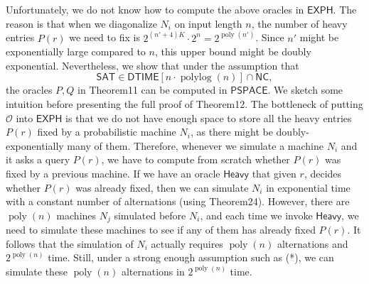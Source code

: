 Unfortunately, we do not know how to compute the above oracles in $\mathsf{EXPH}$. The reason is that when we diagonalize $N_i$ on input length $n$, the number of heavy entries $P(r)$ we need to fix is $2^{(n'+4)K}\cdot2^n=2^{\operatorname{poly}(n')}$. Since $n'$ might be exponentially large compared to $n$, this upper bound might be doubly exponential. Nevertheless, we show that under the assumption that
\[\mathsf{SAT}\in\mathsf{DTIME}[n\cdot\operatorname{polylog}(n)]\cap\mathsf{NC},\tag{*}\]
the oracles $P,Q$ in Theorem11 can be computed in $\mathsf{PSPACE}$.
We sketch some intuition before presenting the full proof of Theorem12. The bottleneck of putting $\mathcal O$ into $\mathsf{EXPH}$ is that we do not have enough space to store all the heavy entries $P(r)$ fixed by a probabilistic machine $N_i$, as there might be doubly-exponentially many of them. Therefore, whenever we simulate a machine $N_i$ and it asks a query $P(r)$, we have to compute from scratch whether $P(r)$ was fixed by a previous machine. If we have an oracle $\mathsf{Heavy}$ that given $r$, decides whether $P(r)$ was already fixed, then we can simulate $N_i$ in exponential time with a constant number of alternations (using Theorem24). However, there are $\operatorname{poly}(n)$ machines $N_j$ simulated before $N_i$, and each time we invoke $\mathsf{Heavy}$, we need to simulate these machines to see if any of them has already fixed $P(r)$. It follows that the simulation of $N_i$ actually requires $\operatorname{poly}(n)$ alternations and $2^{\operatorname{poly}(n)}$ time. Still, under a strong enough assumption such as (*), we can simulate these $\operatorname{poly}(n)$ alternations in $2^{\operatorname{poly}(n)}$ time.
